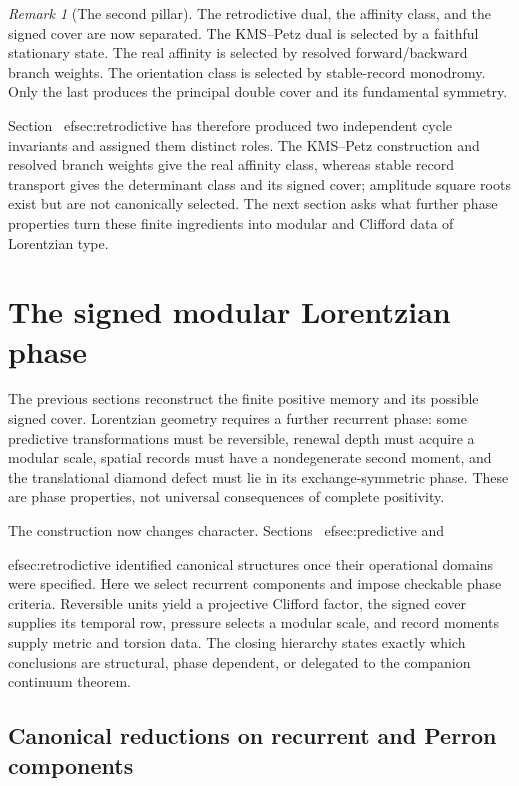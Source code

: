 \documentclass[11pt]{article}
\theoremstyle{definition}
\theoremstyle{remark}
\newtheorem{remark}[theorem]{Remark}
\begin{document}
\begin{remark}[The second pillar]
The retrodictive dual, the affinity class, and the signed cover are now
separated.  The KMS--Petz dual is selected by a faithful stationary state.  The
real affinity is selected by resolved forward/backward branch weights.  The
orientation class is selected by stable-record monodromy.  Only the last
produces the principal double cover and its fundamental symmetry.
\end{remark}

Section~
ef{sec:retrodictive} has therefore produced two independent cycle
invariants and assigned them distinct roles.  The KMS--Petz construction and
resolved branch weights give the real affinity class, whereas stable record
transport gives the determinant class and its signed cover; amplitude square
roots exist but are not canonically selected.  The next section asks what further
phase properties turn these finite ingredients into modular and Clifford data of
Lorentzian type.

\section{The signed modular Lorentzian phase}
\label{sec:phase}

The previous sections reconstruct the finite positive memory and its possible
signed cover.  Lorentzian geometry requires a further recurrent phase: some
predictive transformations must be reversible, renewal depth must acquire a
modular scale, spatial records must have a nondegenerate second moment, and the
translational diamond defect must lie in its exchange-symmetric phase.  These
are phase properties, not universal consequences of complete positivity.

The construction now changes character.  Sections~
ef{sec:predictive} and

ef{sec:retrodictive} identified canonical structures once their operational
domains were specified.  Here we select recurrent components and impose
checkable phase criteria.  Reversible units yield a projective Clifford factor,
the signed cover supplies its temporal row, pressure selects a modular scale, and
record moments supply metric and torsion data.  The closing hierarchy states
exactly which conclusions are structural, phase dependent, or delegated to the
companion continuum theorem.

\subsection{Canonical reductions on recurrent and Perron components}
\end{document}
